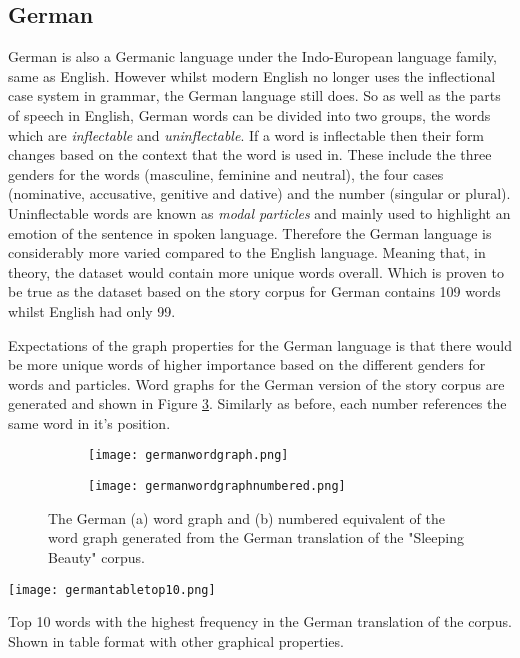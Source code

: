 \subsection{German}
German is also a Germanic language under the Indo-European language family, same as English. However whilst modern English no longer uses the inflectional case system in grammar, the German language still does\cite{durrell2011hammer}. So as well as the parts of speech in English, German words can be divided into two groups, the words which are \emph{inflectable} and \emph{uninflectable}. If a word is inflectable then their form changes based on the context that the word is used in. These include the three genders for the words (masculine, feminine and neutral), the four cases (nominative, accusative, genitive and dative) and the number (singular or plural). Uninflectable words are known as \emph{modal particles} and mainly used to highlight an emotion of the sentence in spoken language. Therefore the German language is considerably more varied compared to the English language. Meaning that, in theory, the dataset would contain more unique words overall. Which is proven to be true as the dataset based on the story corpus for German contains 109 words whilst English had only 99.

Expectations of the graph properties for the German language is that there would be more unique words of higher importance based on the different genders for words and particles. Word graphs for the German version of the story corpus are generated and shown in Figure \ref{fig:gergraph}. Similarly as before, each number references the same word in it's position.

\begin{figure}[H]
\centering
\begin{subfigure}{.45\textwidth}
	\texttt{[image: germanwordgraph.png]}
	\caption{}
	\label{fig:gerword}
\end{subfigure}
\hfill
\begin{subfigure}{.45\textwidth}
	\hspace{-2cm} 
	\texttt{[image: germanwordgraphnumbered.png]}
	\caption{}
	\label{fig:gernum}
\end{subfigure}
\caption{The German  (a) word graph and (b) numbered equivalent of the word graph generated from the German translation of the "Sleeping Beauty" corpus.}
\label{fig:gergraph}
\end{figure}

\begin{table}[H]
\centering
\texttt{[image: germantabletop10.png]}
\caption{Top 10 words with the highest frequency in the German translation of the corpus. Shown in table format with other graphical properties. }
\label{table:germantop}
\end{table}

